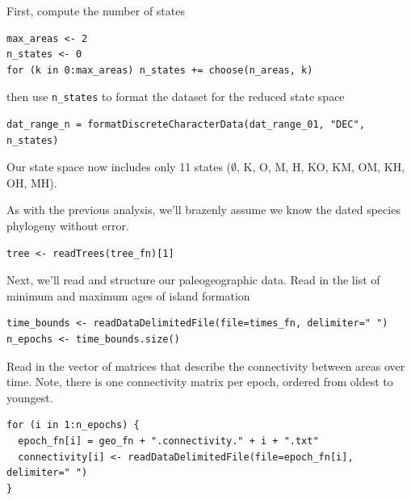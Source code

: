 First, compute the number of states

\begin{snugshade}
\begin{lstlisting}
max_areas <- 2
n_states <- 0
for (k in 0:max_areas) n_states += choose(n_areas, k)
\end{lstlisting}
\end{snugshade}

then use {\tt n\_states} to format the dataset for the reduced state space

\begin{snugshade}
\begin{lstlisting}
dat_range_n = formatDiscreteCharacterData(dat_range_01, "DEC", n_states)
\end{lstlisting}
\end{snugshade}

Our state space now includes only 11 states ($\emptyset$, K, O, M, H, KO, KM, OM, KH, OH, MH).

As with the previous analysis, we'll brazenly assume we know the dated species phylogeny without error.

\begin{snugshade}
\begin{lstlisting}
tree <- readTrees(tree_fn)[1]
\end{lstlisting}
\end{snugshade}

Next, we'll read and structure our paleogeographic data.
Read in the list of minimum and maximum ages of island formation

\begin{snugshade}
\begin{lstlisting}
time_bounds <- readDataDelimitedFile(file=times_fn, delimiter=" ")
n_epochs <- time_bounds.size()
\end{lstlisting}
\end{snugshade}

Read in the vector of matrices that describe the connectivity between areas over time.
Note, there is one connectivity matrix per epoch, ordered from oldest to youngest.

\begin{snugshade}
\begin{lstlisting}
for (i in 1:n_epochs) {
  epoch_fn[i] = geo_fn + ".connectivity." + i + ".txt"
  connectivity[i] <- readDataDelimitedFile(file=epoch_fn[i], delimiter=" ")
}
\end{lstlisting}
\end{snugshade}

